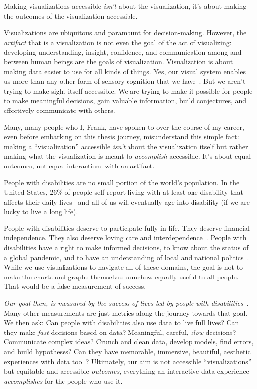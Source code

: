 \documentclass[12pt]{cmuthesis}
\begin{document}
Making visualizations accessible \textit{isn't} about the visualization, it's about making the outcomes of the visualization accessible.

Visualizations are ubiquitous and paramount for decision-making. However, the \textit{artifact} that is a visualization is not even the goal of the act of visualizing: developing understanding, insight, confidence, and communication among and between human beings are the goals of visualization. Visualization is about making data easier to use for all kinds of things. Yes, our visual system enables us more than any other form of sensory cognition that we have~\cite{Gloede2019,Suggate2024,Burke2006}. But we aren't trying to make sight itself accessible. We are trying to make it possible for people to make meaningful decisions, gain valuable information, build conjectures, and effectively communicate with others.

Many, many people who I, Frank, have spoken to over the course of my career, even before embarking on this thesis journey, misunderstand this simple fact: making a ``visualization'' accessible \textit{isn't} about the visualization itself but rather making what the visualization is meant to \textit{accomplish} accessible. It's about equal outcomes, not equal interactions with an artifact.

People with disabilities are no small portion of the world's population. In the United States, 26\% of people self-report living with at least one disability that affects their daily lives~\cite{Okoro2018Prevalence} and all of us will eventually age into disability (if we are lucky to live a long life).

People with disabilities deserve to participate fully in life. They deserve financial independence. They also deserve loving care and interdependence~\cite{Bennett2018Interdependence,Mingus2011AccessIntimacy,Hsueh}. People with disabilities have a right to make informed decisions, to know about the status of a global pandemic, and to have an understanding of local and national politics~\cite{Fan2023Accessibility}. While we use visualizations to navigate all of these domains, the goal is not to make the charts and graphs themselves somehow equally useful to all people. That would be a false measurement of success.

\textit{Our goal then, is measured by the success of lives led by people with disabilities}~\cite{Teng2026}. Many other measurements are just metrics along the journey towards that goal. We then ask: Can people with disabilities also use data to live full lives? Can they make \textit{fast} decisions based on data? Meaningful, careful, \textit{slow} decisions? Communicate complex ideas? Crunch and clean data, develop models, find errors, and build hypotheses? Can they have memorable, immersive, beautiful, aesthetic experiences with data too~\cite{Hsueh}? Ultimately, our aim is not accessible ``visualizations'' but equitable and accessible \textit{outcomes}, everything an interactive data experience \textit{accomplishes} for the people who use it.
\end{document}
